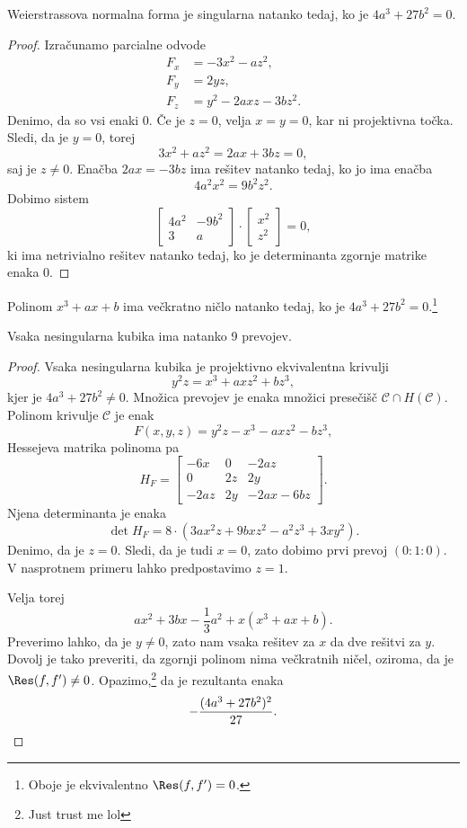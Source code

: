 \begin{trditev}
Weierstrassova normalna forma je singularna natanko tedaj, ko je
$4a^3 + 27b^2 = 0$.
\end{trditev}

\begin{proof}
Izračunamo parcialne odvode
\begin{align*}
F_x &= -3x^2 - az^2,
\\
F_y &= 2yz,
\\
F_z &= y^2 - 2axz - 3bz^2.
\end{align*}
Denimo, da so vsi enaki $0$. Če je $z = 0$, velja $x = y = 0$, kar
ni projektivna točka. Sledi, da je $y = 0$, torej
\[
3x^2 + az^2 = 2ax + 3bz = 0,
\]
saj je $z \ne 0$. Enačba $2ax = -3bz$ ima rešitev natanko tedaj, ko
jo ima enačba
\[
4a^2 x^2 = 9b^2 z^2.
\]
Dobimo sistem
\[
\begin{bmatrix}
4a^2 & -9b^2 \\
 3   &   a
\end{bmatrix}
\cdot
\begin{bmatrix}
x^2 \\
z^2
\end{bmatrix}
=
0,
\]
ki ima netrivialno rešitev natanko tedaj, ko je determinanta
zgornje matrike enaka $0$.
\end{proof}

\begin{opomba}
Polinom $x^3 + ax + b$ ima večkratno ničlo natanko tedaj, ko je
$4a^3 + 27b^2 = 0$.\footnote{Oboje je ekvivalentno
$\Res(f, f') = 0$.}
\end{opomba}


\begin{izrek}
Vsaka nesingularna kubika ima natanko 9 prevojev.
\end{izrek}

\begin{proof}
Vsaka nesingularna kubika je projektivno ekvivalentna krivulji
\[
y^2z = x^3 + axz^2 + bz^3,
\]
kjer je $4a^3 + 27b^2 \ne 0$. Množica prevojev je enaka množici
presečišč $\mathcal{C} \cap H(\mathcal{C})$. Polinom krivulje
$\mathcal{C}$ je enak
\[
F(x,y,z) = y^2z - x^3 - axz^2 - bz^3,
\]
Hessejeva matrika polinoma pa
\[
H_F = \begin{bmatrix}
-6x  & 0  &     -2az   \\
  0  & 2z &      2y    \\
-2az & 2y & -2ax - 6bz
\end{bmatrix}.
\]
Njena determinanta je enaka
\[
\det H_F = 8 \cdot (3ax^2 z + 9bxz^2 - a^2z^3 + 3xy^2).
\]
Denimo, da je $z = 0$. Sledi, da je tudi $x = 0$, zato dobimo prvi
prevoj $(0 : 1 : 0)$. V nasprotnem primeru lahko predpostavimo
$z = 1$.

Velja torej
\[
ax^2 + 3bx - \frac{1}{3} a^2 + x (x^3 + ax + b).
\]
Preverimo lahko, da je $y \ne 0$, zato nam vsaka rešitev za $x$ da
dve rešitvi za $y$. Dovolj je tako preveriti, da zgornji polinom
nima večkratnih ničel, oziroma, da je $\Res(f, f') \ne 0$.
Opazimo,\footnote{Just trust me lol} da je rezultanta enaka
\[
-\frac{(4a^3 + 27b^2)^2}{27}. \qedhere
\]
\end{proof}


